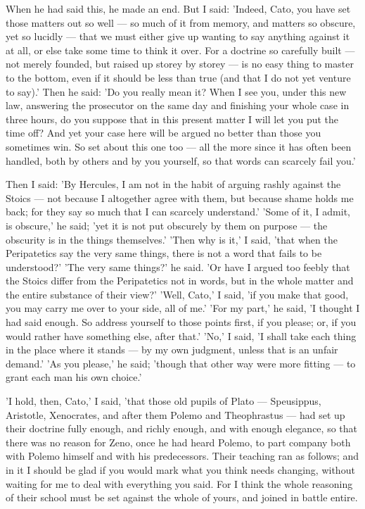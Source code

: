  When he had said this, he made an end. But I said: 'Indeed, Cato, you have set those matters out so well — so much of it from memory, and matters so obscure, yet so lucidly — that we must either give up wanting to say anything against it at all, or else take some time to think it over. For a doctrine so carefully built — not merely founded, but raised up storey by storey — is no easy thing to master to the bottom, even if it should be less than true (and that I do not yet venture to say).' Then he said: 'Do you really mean it? When I see you, under this new law, answering the prosecutor on the same day and finishing your whole case in three hours, do you suppose that in this present matter I will let you put the time off? And yet your case here will be argued no better than those you sometimes win. So set about this one too — all the more since it has often been handled, both by others and by you yourself, so that words can scarcely fail you.'

 Then I said: 'By Hercules, I am not in the habit of arguing rashly against the Stoics — not because I altogether agree with them, but because shame holds me back; for they say so much that I can scarcely understand.' 'Some of it, I admit, is obscure,' he said; 'yet it is not put obscurely by them on purpose — the obscurity is in the things themselves.' 'Then why is it,' I said, 'that when the Peripatetics say the very same things, there is not a word that fails to be understood?' 'The very same things?' he said. 'Or have I argued too feebly that the Stoics differ from the Peripatetics not in words, but in the whole matter and the entire substance of their view?' 'Well, Cato,' I said, 'if you make that good, you may carry me over to your side, all of me.' 'For my part,' he said, 'I thought I had said enough. So address yourself to those points first, if you please; or, if you would rather have something else, after that.' 'No,' I said, 'I shall take each thing in the place where it stands — by my own judgment, unless that is an unfair demand.' 'As you please,' he said; 'though that other way were more fitting — to grant each man his own choice.'

 'I hold, then, Cato,' I said, 'that those old pupils of Plato — Speusippus, Aristotle, Xenocrates, and after them Polemo and Theophrastus — had set up their doctrine fully enough, and richly enough, and with enough elegance, so that there was no reason for Zeno, once he had heard Polemo, to part company both with Polemo himself and with his predecessors. Their teaching ran as follows; and in it I should be glad if you would mark what you think needs changing, without waiting for me to deal with everything you said. For I think the whole reasoning of their school must be set against the whole of yours, and joined in battle entire.

